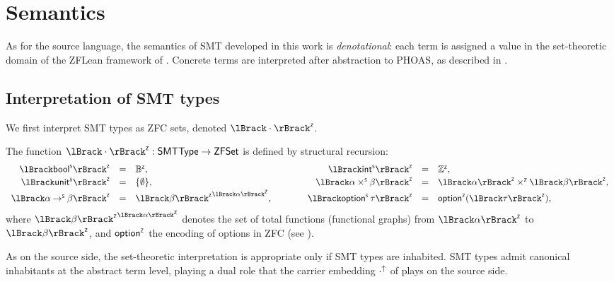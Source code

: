 \section{Semantics}
\label{sec:smt-semantics}

As for the source language, the semantics of SMT developed in this work is
\emph{denotational}: each term is assigned a value in the set-theoretic domain of
the ZFLean framework of .
Concrete terms are interpreted after abstraction to PHOAS, as described in
.

\subsection{Interpretation of SMT types}
\label{subsec:smt-type-interp}

We first interpret SMT types as ZFC sets, denoted \(\interpZ{\cdot}\).

\begin{definition}
  \label{def:smt-type-interp}
  The function \(\interpZ{\cdot} : \mathsf{SMTType} \to \mathsf{ZFSet}\) is
  defined by structural recursion:
  \[
    \begin{array}{rclcrcl}
      \interpZ{\boolS}              & = & \Zbool, & \qquad &
      \interpZ{\intS}               & = & \Zint,                                  \\[2pt]
      \interpZ{\unitS}              & = & \{\emptyset\}, & \qquad &
      \interpZ{\alpha \timesS \beta}& = & \interpZ{\alpha} \timesZ \interpZ{\beta}, \\[2pt]
      \interpZ{\alpha \toS \beta}   & = & {\interpZ{\beta}}^{\interpZ{\alpha}}, & \qquad &
      \interpZ{\optS\tau}           & = & \regnotation{\optZ}(\interpZ{\tau}),
    \end{array}
  \]
  where \({\interpZ{\beta}}^{\interpZ{\alpha}}\) denotes the set of total
  functions (functional graphs) from \(\interpZ{\alpha}\) to \(\interpZ{\beta}\),
  and \(\mathsf{option}^{\scriptscriptstyle{\mathsf{Z}}}\) the encoding of options in ZFC (see ).
\end{definition}

As on the source side, the set-theoretic interpretation is appropriate only if
SMT types are inhabited.
SMT types admit canonical inhabitants at the abstract term level, playing a dual role that
the carrier embedding \({\cdot}^\uparrow\) of  plays on the
source side.

